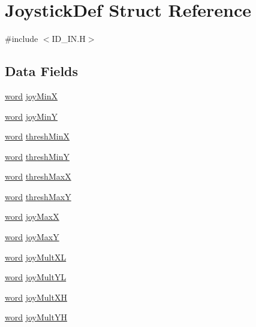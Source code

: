 \hypertarget{structJoystickDef}{
\section{JoystickDef Struct Reference}
\label{structJoystickDef}
}


{\ttfamily \#include $<$ID\_\-IN.H$>$}

\subsection*{Data Fields}
\begin{DoxyCompactItemize}
\item 
\hyperlink{ID__HEAD_8H_abad51e07ab6d26bec9f1f786c8d65bcd}{word} \hyperlink{structJoystickDef_a8540801be78eeb0836b3850f945a774b}{joyMinX}
\item 
\hyperlink{ID__HEAD_8H_abad51e07ab6d26bec9f1f786c8d65bcd}{word} \hyperlink{structJoystickDef_a9c65e7d86e4bcc21b486d2a1abd38078}{joyMinY}
\item 
\hyperlink{ID__HEAD_8H_abad51e07ab6d26bec9f1f786c8d65bcd}{word} \hyperlink{structJoystickDef_aa9e7a143ebd6e4f382a5d649f7a60fcc}{threshMinX}
\item 
\hyperlink{ID__HEAD_8H_abad51e07ab6d26bec9f1f786c8d65bcd}{word} \hyperlink{structJoystickDef_a2414d25acd6aeed35ef60778a71e3a09}{threshMinY}
\item 
\hyperlink{ID__HEAD_8H_abad51e07ab6d26bec9f1f786c8d65bcd}{word} \hyperlink{structJoystickDef_a6c114efc5503e0efda2347e0b48e3f3b}{threshMaxX}
\item 
\hyperlink{ID__HEAD_8H_abad51e07ab6d26bec9f1f786c8d65bcd}{word} \hyperlink{structJoystickDef_a3411384c33b5cf876ddb63350f05f5c3}{threshMaxY}
\item 
\hyperlink{ID__HEAD_8H_abad51e07ab6d26bec9f1f786c8d65bcd}{word} \hyperlink{structJoystickDef_af1c990c326deac72214cd647544e95a9}{joyMaxX}
\item 
\hyperlink{ID__HEAD_8H_abad51e07ab6d26bec9f1f786c8d65bcd}{word} \hyperlink{structJoystickDef_a5c491d6452d2640d94d3d377ef88d473}{joyMaxY}
\item 
\hyperlink{ID__HEAD_8H_abad51e07ab6d26bec9f1f786c8d65bcd}{word} \hyperlink{structJoystickDef_a3500cd6432b371a3db698325115ea4b0}{joyMultXL}
\item 
\hyperlink{ID__HEAD_8H_abad51e07ab6d26bec9f1f786c8d65bcd}{word} \hyperlink{structJoystickDef_aced1d2aa9b75f07818925561e62d2eaf}{joyMultYL}
\item 
\hyperlink{ID__HEAD_8H_abad51e07ab6d26bec9f1f786c8d65bcd}{word} \hyperlink{structJoystickDef_a92d4e3f653f841c7da504077764008ed}{joyMultXH}
\item 
\hyperlink{ID__HEAD_8H_abad51e07ab6d26bec9f1f786c8d65bcd}{word} \hyperlink{structJoystickDef_ab2b6aa7d307af3fe7699e4a1b6c6561f}{joyMultYH}
\end{DoxyCompactItemize}


